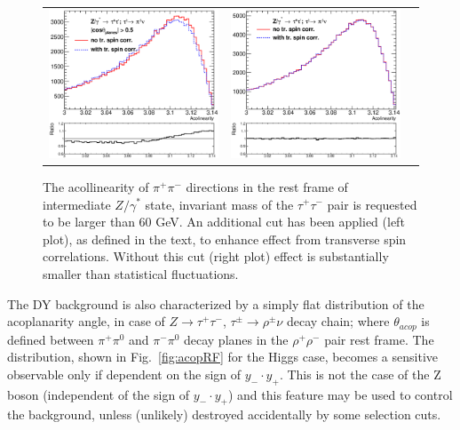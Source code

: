\documentclass[12pt]{article}
\begin{document}
\begin{figure}[htp!]
\begin{tabular}{ccc}
  \includegraphics[width=0.48\columnwidth]{Zelta2.eps} &
  \includegraphics[width=0.48\columnwidth]{elta2-noc.eps} 
\end{tabular}
\caption{
The acollinearity of $\pi^+\pi^-$ directions in the rest frame of intermediate $Z/\gamma^*$ state, invariant mass of the $\tau^+\tau^-$ pair is requested to be larger than 60 GeV. 
An additional cut has been applied (left plot), as defined in the text, to enhance effect
from transverse spin correlations. Without this cut (right plot) effect
is substantially smaller than statistical fluctuations.
\label{fig:Z}}
\end{figure}

The DY background is also characterized by a simply flat distribution of the acoplanarity angle,  
in case of   $Z \to \tau^+ \tau^-$, $\tau^\pm \to \rho^\pm \nu$ decay chain; 
where  $\theta_{acop}$ is defined between $\pi^+ \pi^0$  and $\pi^- \pi^0$ decay 
planes in the $\rho^+ \rho^-$ pair rest frame. The distribution, shown in Fig.~\ref{fig:acopRF} for the Higgs case,
becomes a sensitive observable only if dependent on the sign of  $ y_- \cdot y_+$.
This is not the case of the Z boson (independent of the sign of $ y_- \cdot y_+$) and this feature may be used to control 
the background, unless (unlikely) destroyed accidentally by some selection cuts.
\end{document}
